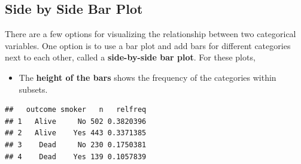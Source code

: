 \documentclass[
]{book}
\newenvironment{Shaded}{\begin{snugshade}}{\end{snugshade}}
\newcommand{\CommentTok}[1]{\textcolor[rgb]{0.56,0.35,0.01}{\textit{#1}}}
\newcommand{\DataTypeTok}[1]{\textcolor[rgb]{0.13,0.29,0.53}{#1}}
\newcommand{\KeywordTok}[1]{\textcolor[rgb]{0.13,0.29,0.53}{\textbf{#1}}}
\newcommand{\NormalTok}[1]{#1}
\newcommand{\OperatorTok}[1]{\textcolor[rgb]{0.81,0.36,0.00}{\textbf{#1}}}
\newcommand{\StringTok}[1]{\textcolor[rgb]{0.31,0.60,0.02}{#1}}
\providecommand{\tightlist}{%
  \setlength{\itemsep}{0pt}\setlength{\parskip}{0pt}}
\begin{document}
\hypertarget{side-by-side-bar-plot}{%
\subsection{Side by Side Bar Plot}\label{side-by-side-bar-plot}}

There are a few options for visualizing the relationship between two categorical variables. One option is to use a bar plot and add bars for different categories next to each other, called a \textbf{side-by-side bar plot}. For these plots,

\begin{itemize}
\tightlist
\item
  The \textbf{height of the bars} shows the frequency of the categories within subsets.
\end{itemize}

\begin{Shaded}
\end{Shaded}

\begin{verbatim}
##   outcome smoker   n   relfreq
## 1   Alive     No 502 0.3820396
## 2   Alive    Yes 443 0.3371385
## 3    Dead     No 230 0.1750381
## 4    Dead    Yes 139 0.1057839
\end{verbatim}

\begin{Shaded}
\end{Shaded}
\end{document}
